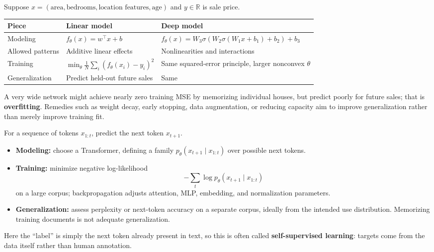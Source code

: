 \documentclass[11pt,a4paper]{article}
\theoremstyle{definition}
\begin{document}
\begin{example}
Suppose $x=(\text{area},\text{bedrooms},\text{location features},\text{age})$ and $y\in\mathbb{R}$ is sale price.
\begin{center}
\begin{tabularx}{\linewidth}{|l|Y|Y|}
\hline
\textbf{Piece} & \textbf{Linear model} & \textbf{Deep model} \\
\hline
Modeling & $f_\theta(x)=w^\top x+b$ & $f_\theta(x)=W_3\sigma(W_2\sigma(W_1x+b_1)+b_2)+b_3$ \\
\hline
Allowed patterns & Additive linear effects & Nonlinearities and interactions \\
\hline
Training & $\displaystyle\min_\theta \frac1N\sum_i(f_\theta(x_i)-y_i)^2$ & Same squared-error principle, larger nonconvex $\theta$ \\
\hline
Generalization & Predict held-out future sales & Same \\
\hline
\end{tabularx}
\end{center}
A very wide network might achieve nearly zero training MSE by memorizing individual houses, but predict poorly for future sales; that is \textbf{overfitting}. Remedies such as weight decay, early stopping, data augmentation, or reducing capacity aim to improve generalization rather than merely improve training fit.
\end{example}

\begin{example}
For a sequence of tokens $x_{1:t}$, predict the next token $x_{t+1}$.
\begin{itemize}
  \item \textbf{Modeling:} choose a Transformer, defining a family $p_\theta(x_{t+1}\mid x_{1:t})$ over possible next tokens.
  \item \textbf{Training:} minimize negative log-likelihood
  \[
  -\sum_t\log p_\theta(x_{t+1}\mid x_{1:t})
  \]
  on a large corpus; backpropagation adjusts attention, MLP, embedding, and normalization parameters.
  \item \textbf{Generalization:} assess perplexity or next-token accuracy on a separate corpus, ideally from the intended use distribution. Memorizing training documents is not adequate generalization.
\end{itemize}
Here the ``label'' is simply the next token already present in text, so this is often called \textbf{self-supervised learning}: targets come from the data itself rather than human annotation.
\end{example}
\end{document}
